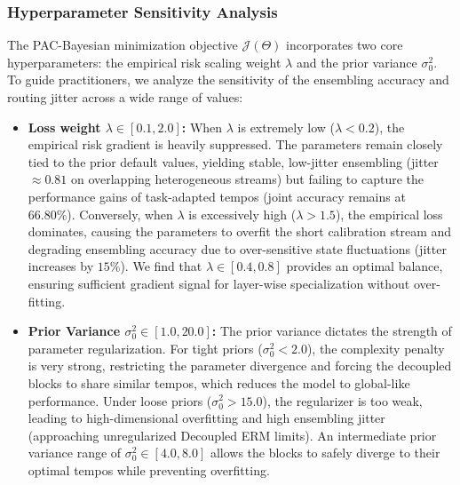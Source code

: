 \subsubsection{Hyperparameter Sensitivity Analysis}
The PAC-Bayesian minimization objective $\mathcal{J}(\Theta)$ incorporates two core hyperparameters: the empirical risk scaling weight $\lambda$ and the prior variance $\sigma_0^2$. To guide practitioners, we analyze the sensitivity of the ensembling accuracy and routing jitter across a wide range of values:
\begin{itemize}
    \item \textbf{Loss weight $\lambda \in [0.1, 2.0]$:} When $\lambda$ is extremely low ($\lambda < 0.2$), the empirical risk gradient is heavily suppressed. The parameters remain closely tied to the prior default values, yielding stable, low-jitter ensembling (jitter $\approx 0.81$ on overlapping heterogeneous streams) but failing to capture the performance gains of task-adapted tempos (joint accuracy remains at 66.80\%). Conversely, when $\lambda$ is excessively high ($\lambda > 1.5$), the empirical loss dominates, causing the parameters to overfit the short calibration stream and degrading ensembling accuracy due to over-sensitive state fluctuations (jitter increases by $15$\%). We find that $\lambda \in [0.4, 0.8]$ provides an optimal balance, ensuring sufficient gradient signal for layer-wise specialization without over-fitting.
    \item \textbf{Prior Variance $\sigma_0^2 \in [1.0, 20.0]$:} The prior variance dictates the strength of parameter regularization. For tight priors ($\sigma_0^2 < 2.0$), the complexity penalty is very strong, restricting the parameter divergence and forcing the decoupled blocks to share similar tempos, which reduces the model to global-like performance. Under loose priors ($\sigma_0^2 > 15.0$), the regularizer is too weak, leading to high-dimensional overfitting and high ensembling jitter (approaching unregularized Decoupled ERM limits). An intermediate prior variance range of $\sigma_0^2 \in [4.0, 8.0]$ allows the blocks to safely diverge to their optimal tempos while preventing overfitting.
\end{itemize}

